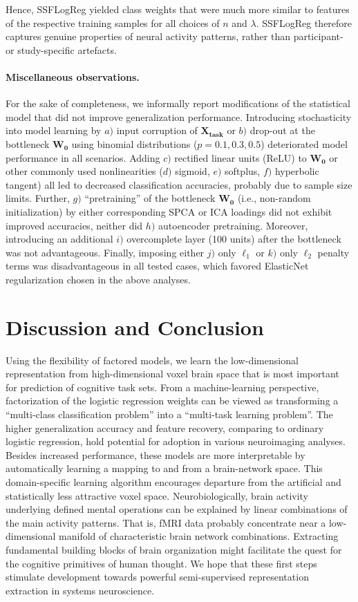 \documentclass{article} %
\begin{document}
%
Hence, SSFLogReg yielded class weights 
that were much more similar to features of the respective training samples
for all choices of $n$ and $\lambda$.
SSFLogReg therefore
captures genuine properties of neural activity patterns,
rather than participant- or study-specific artefacts.

\paragraph{Miscellaneous observations.}
For the sake of completeness,
we informally report modifications of the statistical model
that did not improve generalization performance.
%
Introducing stochasticity into model learning by 
$a)$ input corruption of $\mathbf{X_{task}}$ or
$b)$ drop-out at the bottleneck $\mathbf{W_0}$ using binomial
distributions ($p=0.1, 0.3, 0.5$) deteriorated model performance
in all scenarios.
%
Adding $c)$ rectified linear units (ReLU) to $\mathbf{W_0}$ or
other commonly used nonlinearities ($d)$ sigmoid, $e)$ softplus,
$f)$ hyperbolic tangent) all led to decreased classification accuracies,
probably due to sample size limits.
%
Further, $g)$ ``pretraining'' of the bottleneck $\mathbf{W_0}$
(i.e., non-random initialization) by 
either corresponding SPCA or ICA loadings did not exhibit improved accuracies,
neither did $h)$ autoencoder pretraining.
%
Moreover,
introducing an additional $i)$ overcomplete layer (100 units)
after the bottleneck was not advantageous.
%
Finally, imposing either $j)$ only $\ell_1$ or 
$k)$ only $\ell_2$ penalty terms
was disadvantageous in all tested cases,
which favored ElasticNet regularization chosen in the above analyses.

\section{Discussion and Conclusion}
Using the flexibility of factored models,
we learn the low-dimensional representation from high-dimensional
voxel brain space that is most important for
prediction of cognitive task sets.
%
From a machine-learning perspective,
factorization of the logistic regression weights
can be viewed as transforming a
``multi-class classification problem''
into a ``multi-task learning problem''.
%
The higher generalization accuracy and feature recovery, comparing to
ordinary logistic regression, hold potential
for adoption in various neuroimaging analyses.
Besides increased performance, these models are more interpretable by
automatically learning a mapping to and from a brain-network space.
%
This domain-specific learning algorithm
encourages departure from the artificial and statistically
less attractive voxel space.
Neurobiologically,
brain activity underlying defined mental operations
can be explained by linear combinations of the main activity
patterns.
%
That is,
fMRI data probably concentrate near
a low-dimensional manifold of
characteristic brain network combinations.
Extracting fundamental building blocks of brain organization might
facilitate the quest for the cognitive primitives of
human thought.
%
We hope that these first steps stimulate development towards
powerful semi-supervised representation extraction
in systems neuroscience.
\end{document}
